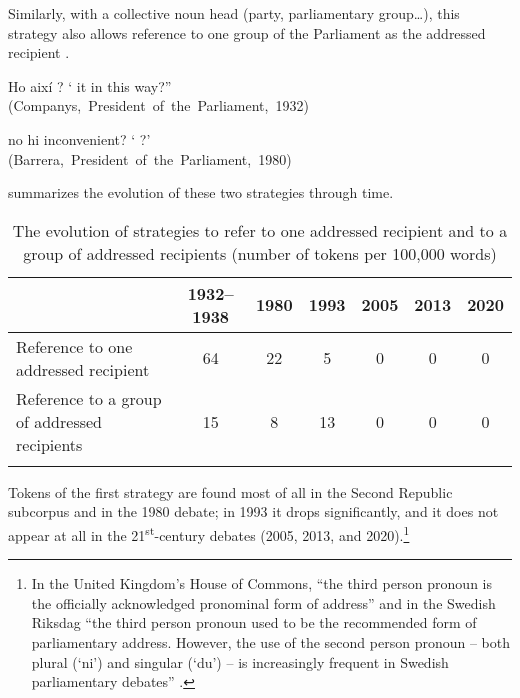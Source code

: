 \documentclass[output=paper]{langscibook}
\begin{document}
Similarly, with a collective noun head (party, parliamentary group…), this strategy also allows reference to one group of the Parliament as the addressed recipient .

\ea\label{ex:nogue:30}
 \ea\label{ex:nogue:30a}
{{Ho}  {així} ?}
\glt `     it in this way?” \\
\hfill\hbox{(Companys, President of the Parliament, 1932)}

\ex\label{ex:nogue:30b}
{ {no hi}  {inconvenient?}}
\glt `    ?'\\
\hfill\hbox{(Barrera, President of the Parliament, 1980)}
\z \z 


 summarizes the evolution of these two strategies through time.


\begin{table}
\begin{tabularx}{\textwidth}{Qcccccc} 
\lsptoprule
& {1932–1938} & {1980} & {1993} & {2005} & {2013} & {{2020}}\\
\midrule
Reference to one addressed recipient& {64} & {22} & {5} & {0} & {0} & {0}\\
\midrule 
Reference to a group of addressed recipients& {15} & {8} & {13} & {0} & {0} & {0}\\
\lspbottomrule
\end{tabularx}
\caption{The evolution of  strategies to refer to one addressed recipient and to a group of addressed recipients (number of tokens per 100,000 words)}
\label{tab:nogue:13}
\end{table}


Tokens of the first strategy are found most of all in the Second Republic subcorpus and in the 1980 debate; in 1993 it drops significantly, and it does not appear at all in the 21\textsuperscript{st}{}-century debates (2005, 2013, and 2020).\footnote{In the United Kingdom’s House of Commons, “the third person pronoun is the officially acknowledged pronominal form of address” and in the Swedish Riksdag “the third person pronoun used to be the recommended form of parliamentary address. However, the use of the second person pronoun – both plural (‘ni’) and singular (‘du’) – is increasingly frequent in Swedish parliamentary debates” \citep[891]{Ilie2010}.}
\end{document}

